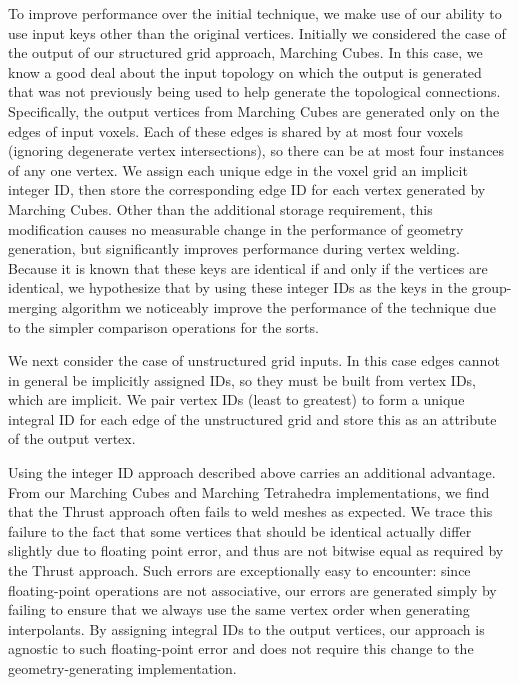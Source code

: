 \documentclass[journal]{vgtc}                %
\begin{document}
\label{sec:IntegralIDs}
To improve performance over the initial technique, we make use of our ability to use input keys other than the original vertices. Initially we considered the case of the output of our structured grid
approach, Marching Cubes. In this case, we know a good deal about the input topology on which the output is generated that was not previously being used to help generate the topological connections. Specifically, the output vertices from Marching Cubes are generated only on the edges of input voxels. Each of these edges is shared by at most four voxels (ignoring degenerate vertex intersections), so there can be at most four instances of any one vertex.
We assign each unique edge in the voxel grid an implicit integer ID, then store the corresponding edge ID for each vertex generated by Marching Cubes. Other than the additional storage requirement, this modification causes no measurable change in the performance of geometry generation, but significantly improves performance during vertex welding. Because it is known that these keys are identical if and only if the vertices are identical, we hypothesize that by using these integer IDs as the keys in the group-merging algorithm we noticeably improve the performance of the technique due to the simpler comparison operations for the sorts. 

We next consider the case of unstructured grid inputs. In this case edges cannot in general be implicitly assigned IDs, so they must be built from vertex IDs, which are implicit. We pair vertex IDs (least to greatest) to form a unique integral ID for each edge of the unstructured grid and store this as an attribute of the output vertex. 

Using the integer ID approach described above carries an additional advantage. From our Marching Cubes and Marching Tetrahedra implementations, we find that the Thrust approach often fails to weld meshes as expected. We trace this failure to the fact that some vertices that should be identical actually differ slightly due to floating point error, and thus are not bitwise equal as required by the Thrust approach. Such errors are exceptionally easy to encounter: since floating-point operations are not associative, our errors are generated simply by failing to ensure that we always use the same vertex order when generating interpolants. By assigning integral IDs to the output vertices, our approach is agnostic to such floating-point error and does not require this change to the geometry-generating implementation.
\end{document}
